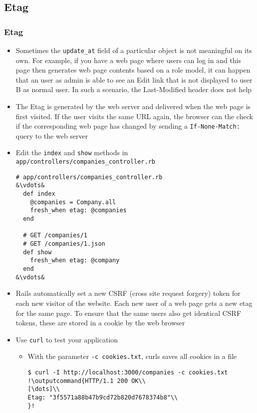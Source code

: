 \documentclass{beamer}
\newcommand{\outputcommand}[1]{\color{darkgreen}{#1}}
\begin{document}
\subsection{Etag}
\begin{frame}
\frametitle{Etag}
\begin{itemize}
\item Sometimes the \texttt{update\_at} field of a particular object is not meaningful on its own. For example, if you have a web page where users can log in and this page then generates web page contents based on a role model, it can happen that an user as admin is able to see an Edit link that is not displayed to user B as normal user. In such a scenario, the Last-Modified header does not help
\item The Etag is generated by the web server and delivered when the web page is first visited. If the user visits the same URL again, the browser can the check if the corresponding web page has changed by sending a \texttt{If-None-Match:} query to the web server


\item Edit the \texttt{index} and \texttt{show} methods in \texttt{app/controllers/companies\_controller.rb}
\lstset{language=Ruby, style=eclipse}
\begin{lstlisting}[escapechar=&]
# app/controllers/companies_controller.rb
&\vdots&
  def index
    @companies = Company.all
    fresh_when etag: @companies
  end

  # GET /companies/1
  # GET /companies/1.json
  def show
    fresh_when etag: @company
  end
&\vdots&
\end{lstlisting}
\item Rails automatically set a new CSRF (cross site request forgery) token for each new visitor of the website. Each new user of a web page gets a new etag for the same page. To ensure that the same users also get identical CSRF tokens, these are stored in a cookie by the web browser

\item Use \texttt{curl} to test your application

\begin{itemize}

\item With the parameter \texttt{-c cookies.txt}, curls saves all cookies in a file

\lstset{language=shell}
\begin{lstlisting}[escapechar=!]
$ curl -I http://localhost:3000/companies -c cookies.txt
!\outputcommand{HTTP/1.1 200 OK\\
[\dots]\\
Etag: "3f5571a88b47b9cd72b820d7678374b8"\\
}!
\end{lstlisting}


\end{itemize}
\end{itemize}
\end{frame}
\end{document}
